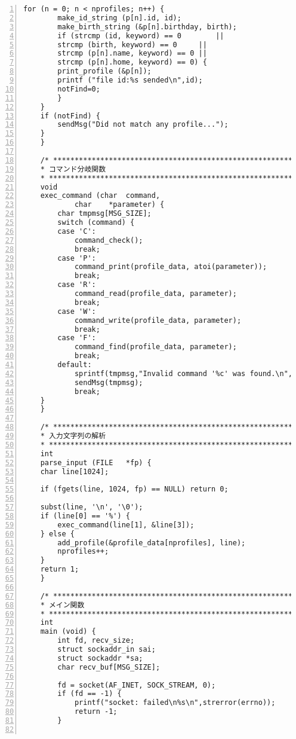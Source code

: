 \documentclass[11pt]{jarticle}
\begin{document}
\begin{lstlisting}[caption=サーバ側プログラム,label=server,numbers=left]
    for (n = 0; n < nprofiles; n++) {
        make_id_string (p[n].id, id);
        make_birth_string (&p[n].birthday, birth);
        if (strcmp (id, keyword) == 0        ||
        strcmp (birth, keyword) == 0     ||
        strcmp (p[n].name, keyword) == 0 ||
        strcmp (p[n].home, keyword) == 0) {
        print_profile (&p[n]);
        printf ("file id:%s sended\n",id);
        notFind=0;
        }
    }
    if (notFind) {
        sendMsg("Did not match any profile...");
    }
    }

    /* ************************************************************ *
    * コマンド分岐関数
    * ************************************************************* */
    void
    exec_command (char	command,
            char	*parameter) {
        char tmpmsg[MSG_SIZE];
        switch (command) {
        case 'C':
            command_check();
            break;
        case 'P':
            command_print(profile_data, atoi(parameter));
            break;
        case 'R':
            command_read(profile_data, parameter);
            break;
        case 'W':
            command_write(profile_data, parameter);    
            break;
        case 'F':
            command_find(profile_data, parameter);    
            break;
        default:
            sprintf(tmpmsg,"Invalid command '%c' was found.\n", command);
            sendMsg(tmpmsg);
            break;
    }
    }	      

    /* ********************************************************* *
    * 入力文字列の解析
    * ********************************************************** */
    int
    parse_input (FILE	*fp) {
    char line[1024];

    if (fgets(line, 1024, fp) == NULL) return 0;

    subst(line, '\n', '\0');
    if (line[0] == '%') {
        exec_command(line[1], &line[3]);
    } else {
        add_profile(&profile_data[nprofiles], line);
        nprofiles++;
    }
    return 1;
    }

    /* ********************************************************* *
    * メイン関数
    * ********************************************************** */
    int
    main (void) {
        int fd, recv_size;
        struct sockaddr_in sai;
        struct sockaddr *sa;
        char recv_buf[MSG_SIZE];

        fd = socket(AF_INET, SOCK_STREAM, 0);
        if (fd == -1) {
            printf("socket: failed\n%s\n",strerror(errno));
            return -1;
        }


\end{lstlisting}
\end{document}
